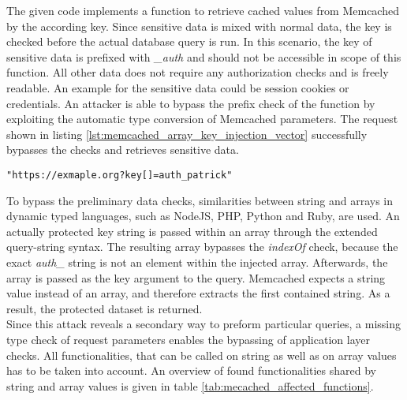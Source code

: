 The given code implements a function to retrieve cached values from Memcached by the according key. Since sensitive data is mixed with normal data, the key is checked before the actual database query is run. In this scenario, the key of sensitive data is prefixed with \emph{\_auth} and should not be accessible in scope of this function. All other data does not require any authorization checks and is freely readable. An example for the sensitive data could be session cookies or credentials. An attacker is able to bypass the prefix check of the function by exploiting the automatic type conversion of Memcached parameters. The request shown in listing \ref{lst:memcached_array_key_injection_vector} successfully bypasses the checks and retrieves sensitive data. \\

\begin{lstlisting}[caption={Attack vectors on Memcached for array key injection via the query-string parameter}, label={lst:memcached_array_key_injection_vector}]
"https://exmaple.org?key[]=auth_patrick"
\end{lstlisting}

To bypass the preliminary data checks, similarities between string and arrays in dynamic typed languages, such as NodeJS, PHP, Python and Ruby, are used. An actually protected key string is passed within an array through the extended query-string syntax. The resulting array bypasses the \emph{indexOf} check, because the exact \emph{auth\_} string is not an element within the injected array. Afterwards, the array is passed as the key argument to the query. Memcached expects a string value instead of an array, and therefore extracts the first contained string. As a result, the protected dataset is returned.\\

Since this attack reveals a secondary way to preform particular queries, a missing type check of request parameters enables the bypassing of application layer checks. All functionalities, that can be called on string as well as on array values has to be taken into account. An overview of found functionalities shared by string and array values is given in table \ref{tab:mecached_affected_functions}.

